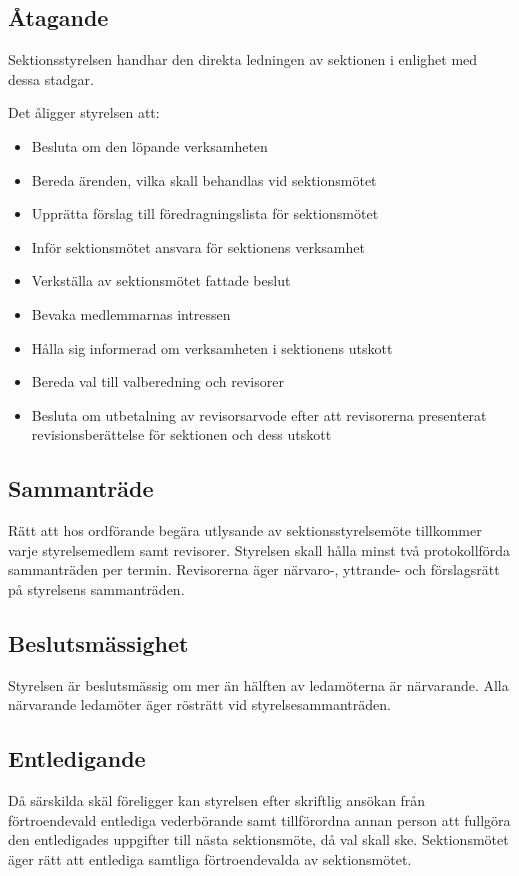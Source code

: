 \documentclass{datateknologsektionen-document}
\begin{document}
\subsection{Åtagande}
Sektionsstyrelsen handhar den direkta ledningen av sektionen i enlighet med dessa stadgar.

Det åligger styrelsen att:
\begin{itemize}
  \item Besluta om den löpande verksamheten
  \item Bereda ärenden, vilka skall behandlas vid sektionsmötet
  \item Upprätta förslag till föredragningslista för sektionsmötet
  \item Inför sektionsmötet ansvara för sektionens verksamhet
  \item Verkställa av sektionsmötet fattade beslut
  \item Bevaka medlemmarnas intressen
  \item Hålla sig informerad om verksamheten i sektionens utskott
  \item Bereda val till valberedning och revisorer
  \item Besluta om utbetalning av revisorsarvode efter att revisorerna presenterat
        revisionsberättelse för sektionen och dess utskott
\end{itemize}

\subsection{Sammanträde}
\label{sektionsstyrelsensammantrade}
Rätt att hos ordförande begära utlysande av sektionsstyrelsemöte tillkommer varje
styrelsemedlem samt revisorer. Styrelsen skall hålla minst två protokollförda sammanträden per termin.
Revisorerna äger närvaro-, yttrande- och förslagsrätt på styrelsens sammanträden.

\subsection{Beslutsmässighet}
Styrelsen är beslutsmässig om mer än hälften av ledamöterna är närvarande. Alla
närvarande ledamöter äger rösträtt vid styrelsesammanträden.

\subsection{Entledigande}
Då särskilda skäl föreligger kan styrelsen efter skriftlig ansökan från förtroendevald
entlediga vederbörande samt tillförordna annan person att fullgöra den entledigades
uppgifter till nästa sektionsmöte, då val skall ske. Sektionsmötet äger rätt att entlediga
samtliga förtroendevalda av sektionsmötet.
\end{document}
